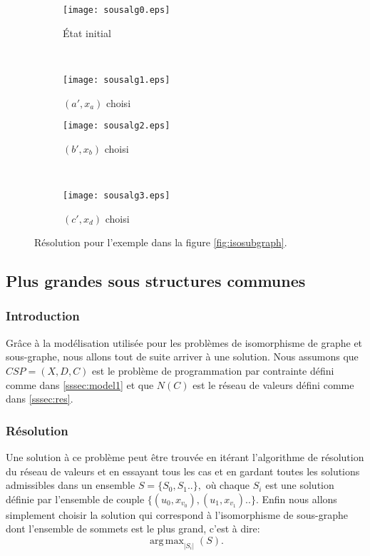 \documentclass[french]{article}
\theoremstyle{definition}
\theoremstyle{remark}
\DeclareMathOperator*{\argmax}{arg\,max}
\begin{document}
\begin{figure*}[t!]
	\begin{subfigure}[t]{0.5\textwidth}
		\centering
		\texttt{[image: sousalg0.eps]}
		\caption{État initial}
	\end{subfigure}%
	~
	\begin{subfigure}[t]{0.5\textwidth}
		\centering
		\texttt{[image: sousalg1.eps]}
		\caption{$(a', x_a)$ choisi}
	\end{subfigure}
	
	\begin{subfigure}[t]{0.5\textwidth}
		\centering
		\texttt{[image: sousalg2.eps]}
		\caption{$(b', x_b)$ choisi}
	\end{subfigure}
	~
	\begin{subfigure}[t]{0.5\textwidth}
		\centering
		\texttt{[image: sousalg3.eps]}
		\caption{$(c', x_d)$ choisi}
	\end{subfigure}
	
	\caption{\label{fig:sousalgstar} Résolution pour l'exemple dans la figure \ref{fig:isosubgraph}.}
\end{figure*}

\newpage
\subsection{Plus grandes sous structures communes}
\subsubsection{Introduction}
Grâce à la modélisation utilisée pour les problèmes de isomorphisme de graphe et sous-graphe, nous allons tout de suite arriver à une solution. Nous assumons que $CSP=(X,D,C)$ est le problème de programmation par contrainte défini comme dans \ref{sssec:model1} et que $N(C)$ est le réseau de valeurs défini comme dans \ref{sssec:res}.

\subsubsection{Résolution}
Une solution à ce problème peut être trouvée en itérant l'algorithme de résolution du réseau de valeurs et en essayant tous les cas et en gardant toutes les solutions admissibles dans un ensemble $S=\{S_0, S_1..\},$ où chaque $S_i$ est une solution définie par l'ensemble de couple $\{ (u_0, x_{v_0}), (u_1, x_{v_1}).. \}$. Enfin nous allons simplement choisir la solution qui correspond à l'isomorphisme de sous-graphe dont l'ensemble de sommets est le plus grand, c'est à dire:
\[
\argmax_{|S_i|} (S).
\]
\end{document}
